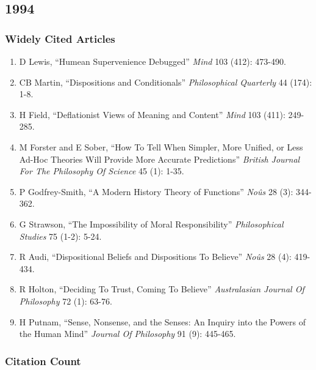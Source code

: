 \documentclass[
  10pt,
  letterpaper,
  DIV=11,
  numbers=noendperiod,
  twoside]{scrartcl}
\providecommand{\tightlist}{%
  \setlength{\itemsep}{0pt}\setlength{\parskip}{0pt}}\usepackage{longtable,booktabs,array}
\begin{document}
\newpage

\subsection{1994}\label{section-18}

\subsubsection*{Widely Cited Articles}\label{widely-cited-articles-18}

\begin{enumerate}
\def\labelenumi{\arabic{enumi}.}
\tightlist
\item
  D Lewis, ``Humean Supervenience Debugged'' \emph{Mind} 103 (412):
  473-490.
\item
  CB Martin, ``Dispositions and Conditionals'' \emph{Philosophical
  Quarterly} 44 (174): 1-8.
\item
  H Field, ``Deflationist Views of Meaning and Content'' \emph{Mind} 103
  (411): 249-285.
\item
  M Forster and E Sober, ``How To Tell When Simpler, More Unified, or
  Less Ad-Hoc Theories Will Provide More Accurate Predictions''
  \emph{British Journal For The Philosophy Of Science} 45 (1): 1-35.
\item
  P Godfrey-Smith, ``A Modern History Theory of Functions'' \emph{Noûs}
  28 (3): 344-362.
\item
  G Strawson, ``The Impossibility of Moral Responsibility''
  \emph{Philosophical Studies} 75 (1-2): 5-24.
\item
  R Audi, ``Dispositional Beliefs and Dispositions To Believe''
  \emph{Noûs} 28 (4): 419-434.
\item
  R Holton, ``Deciding To Trust, Coming To Believe'' \emph{Australasian
  Journal Of Philosophy} 72 (1): 63-76.
\item
  H Putnam, ``Sense, Nonsense, and the Senses: An Inquiry into the
  Powers of the Human Mind'' \emph{Journal Of Philosophy} 91 (9):
  445-465.
\end{enumerate}

\subsubsection*{Citation Count}\label{citation-count-18}
\end{document}

